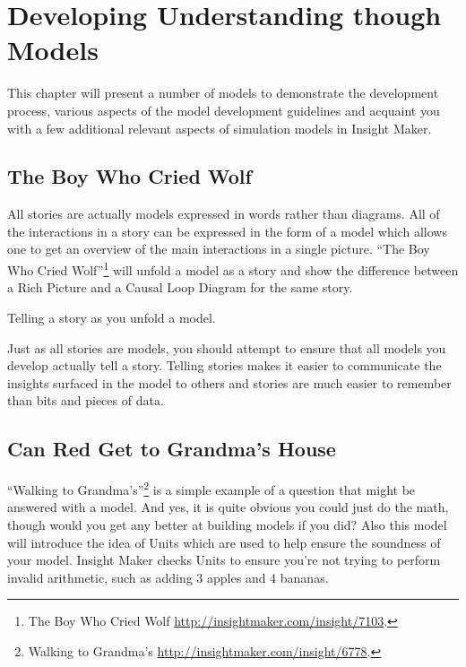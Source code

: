 \documentclass[]{memoir}
\begin{document}
\chapter{Developing Understanding though Models}

This chapter will present a number of models to demonstrate the
development process, various aspects of the model development guidelines
and acquaint you with a few additional relevant aspects of simulation
models in Insight Maker.

\section{The Boy Who Cried Wolf}

All stories are actually models expressed in words rather than diagrams.
All of the interactions in a story can be expressed in the form of a
model which allows one to get an overview of the main interactions in a
single picture. ``The Boy Who Cried Wolf''\footnote{The Boy Who Cried
  Wolf \url{http://insightmaker.com/insight/7103}.} will unfold a model
as a story and show the difference between a Rich Picture and a Causal
Loop Diagram for the same story.

\FloatBarrier 

\begin{model}[frametitle={Model: The Boy Who Cried Wolf}] 

 Telling a story as you unfold a model.




 \end{model}

Just as all stories are models, you should attempt to ensure that all
models you develop actually tell a story. Telling stories makes it
easier to communicate the insights surfaced in the model to others and
stories are much easier to remember than bits and pieces of data.

\section{Can Red Get to Grandma's House}

``Walking to Grandma's''\footnote{Walking to Grandma's
  \url{http://insightmaker.com/insight/6778}.} is a simple example of a
question that might be answered with a model. And yes, it is quite
obvious you could just do the math, though would you get any better at
building models if you did? Also this model will introduce the idea of
Units which are used to help ensure the soundness of your model. Insight
Maker checks Units to ensure you're not trying to perform invalid
arithmetic, such as adding 3 apples and 4 bananas.
\end{document}
